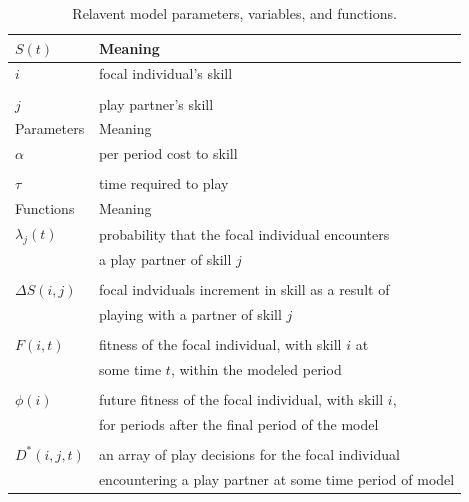 \documentclass[12pt,letterpaper]{article}
\begin{document}
\begin{table}[h]
\caption{Relavent model parameters, variables, and functions.}
\centering
\begin{tabular}{l l}
\hline
$S(t)$ & Meaning \\ 
\hline 
$i$ & focal individual's skill \\ 
\\
$j$ & play partner's skill \\
\hline 
Parameters & Meaning \\
\hline
$\alpha$ & per period cost to skill\\
\\
$\tau$ & time required to play \\
\hline
Functions & Meaning \\
\hline
$\lambda_j(t)$ & probability that the focal individual encounters \\ 
$ $ & a play partner of skill $j$\\
\\
$\Delta S(i,j)$ & focal indviduals increment in skill as a result of \\ 
$ $ & playing with a partner of skill $j$\\
\\
$F(i,t)$ & fitness of the focal individual, with skill $i$ at \\
$ $ & some time $t$, within the modeled period \\
\\
$\phi(i)$ & future fitness of the focal individual, with skill $i$, \\
$ $ &  for periods after the final period of the model\\
\\
$D^*(i,j,t)$ & an array of play decisions for the focal individual \\
$ $ & encountering a play partner at some time period of model \\ 

\hline
\end{tabular}

\label{Tab:param}
\end{table}
        
\end{document}
